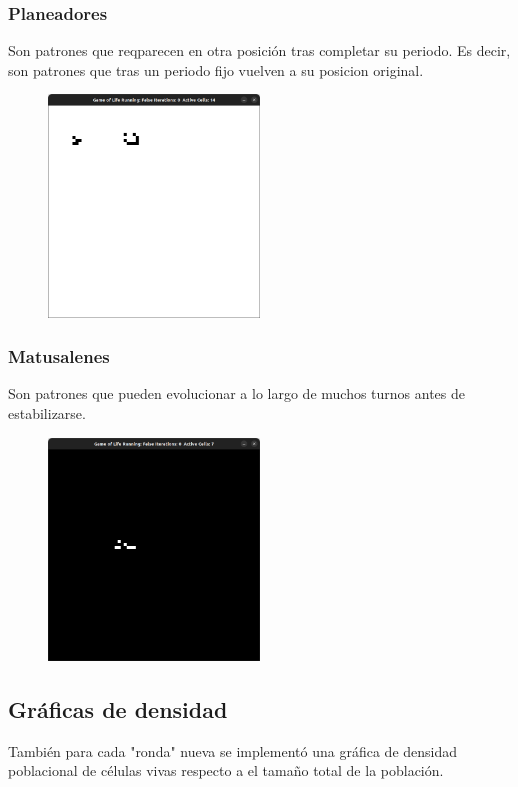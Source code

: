 \documentclass[10pt]{article}
\begin{document}
            \subsubsection{Planeadores}
            Son patrones que reqparecen en otra posición tras completar su periodo. Es decir, son patrones que tras un periodo fijo vuelven a su posicion original.
            \begin{figure}[h!]
                \centering
                \includegraphics[width=0.5\textwidth]{planeadores.png}
            \end{figure}
            \subsubsection{Matusalenes}
            Son patrones que pueden evolucionar a lo largo de muchos turnos antes de estabilizarse. 
            \begin{figure}[h!]
                \centering
                \includegraphics[width=0.5\textwidth]{matusalen.png}
            \end{figure}
            \subsection{Gráficas de densidad}
            También para cada "ronda" nueva se implementó una gráfica de densidad poblacional de células vivas respecto a el tamaño total de la población.
\end{document}
